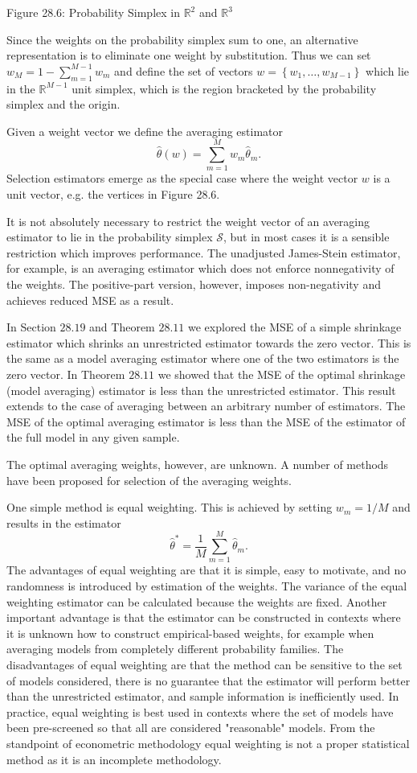 \documentclass[10pt]{article}
\begin{document}
Figure 28.6: Probability Simplex in $\mathbb{R}^{2}$ and $\mathbb{R}^{3}$

Since the weights on the probability simplex sum to one, an alternative representation is to eliminate one weight by substitution. Thus we can set $w_{M}=1-\sum_{m=1}^{M-1} w_{m}$ and define the set of vectors $w=\left\{w_{1}, \ldots, w_{M-1}\right\}$ which lie in the $\mathbb{R}^{M-1}$ unit simplex, which is the region bracketed by the probability simplex and the origin.

Given a weight vector we define the averaging estimator
$$
\widehat{\theta}(w)=\sum_{m=1}^{M} w_{m} \widehat{\theta}_{m} .
$$
Selection estimators emerge as the special case where the weight vector $w$ is a unit vector, e.g. the vertices in Figure 28.6.

It is not absolutely necessary to restrict the weight vector of an averaging estimator to lie in the probability simplex $\mathscr{S}$, but in most cases it is a sensible restriction which improves performance. The unadjusted James-Stein estimator, for example, is an averaging estimator which does not enforce nonnegativity of the weights. The positive-part version, however, imposes non-negativity and achieves reduced MSE as a result.

In Section $28.19$ and Theorem $28.11$ we explored the MSE of a simple shrinkage estimator which shrinks an unrestricted estimator towards the zero vector. This is the same as a model averaging estimator where one of the two estimators is the zero vector. In Theorem $28.11$ we showed that the MSE of the optimal shrinkage (model averaging) estimator is less than the unrestricted estimator. This result extends to the case of averaging between an arbitrary number of estimators. The MSE of the optimal averaging estimator is less than the MSE of the estimator of the full model in any given sample.

The optimal averaging weights, however, are unknown. A number of methods have been proposed for selection of the averaging weights.

One simple method is equal weighting. This is achieved by setting $w_{m}=1 / M$ and results in the estimator
$$
\widehat{\theta}^{*}=\frac{1}{M} \sum_{m=1}^{M} \widehat{\theta}_{m} .
$$
The advantages of equal weighting are that it is simple, easy to motivate, and no randomness is introduced by estimation of the weights. The variance of the equal weighting estimator can be calculated because the weights are fixed. Another important advantage is that the estimator can be constructed in contexts where it is unknown how to construct empirical-based weights, for example when averaging models from completely different probability families. The disadvantages of equal weighting are that the method can be sensitive to the set of models considered, there is no guarantee that the estimator will perform better than the unrestricted estimator, and sample information is inefficiently used. In practice, equal weighting is best used in contexts where the set of models have been pre-screened so that all are considered "reasonable" models. From the standpoint of econometric methodology equal weighting is not a proper statistical method as it is an incomplete methodology.
\end{document}
